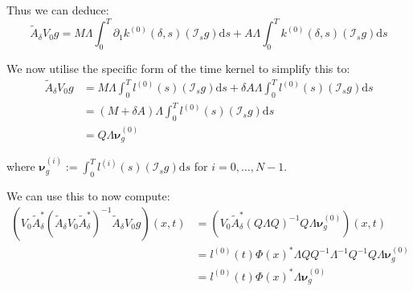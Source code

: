 \documentclass{article}
\theoremstyle{definition}
\theoremstyle{remark}
\theoremstyle{remark}
\begin{document}
\noindent Thus we can deduce:
\begin{equation}
    \tilde{A}_{\delta}V_{0}g=M\Lambda\int_{0}^{T}\partial_{1}k^{(0)}(\delta,s)(\mathcal{I}_{s}g)\mathrm{d}s + A\Lambda\int_{0}^{T}k^{(0)}(\delta,s)(\mathcal{I}_{s}g)\mathrm{d}s
\end{equation}

\noindent We now utilise the specific form of the time kernel to simplify this to:
\begin{align}
    \tilde{A}_{\delta}V_{0}g &= M\Lambda\int_{0}^{T}l^{(0)}(s)(\mathcal{I}_{s}g)\mathrm{d}s + \delta A\Lambda\int_{0}^{T}l^{(0)}(s)(\mathcal{I}_{s}g)\mathrm{d}s \\
    &= (M+\delta A)\Lambda\int_{0}^{T}l^{(0)}(s)(\mathcal{I}_{s}g)\mathrm{d}s \\
    &= Q\Lambda\boldsymbol{\nu}_{g}^{(0)}
\end{align}

where $\boldsymbol{\nu}_{g}^{(i)}:=\int_{0}^{T}l^{(i)}(s)(\mathcal{I}_{s}g)\mathrm{d}s$ for $i=0,\dots,N-1$.

\noindent We can use this to now compute:
\begin{align*}
    (V_{0}\tilde{A}_{\delta}^{*}(\tilde{A}_{\delta}V_{0}\tilde{A}_{\delta}^{*})^{-1}\tilde{A}_{\delta}V_{0}g)(x,t) &=
    (V_{0}\tilde{A}_{\delta}^{*}(Q\Lambda Q)^{-1}Q\Lambda\boldsymbol{\nu}_{g}^{(0)})(x,t) \\
    &=l^{(0)}(t)\Phi(x)^{*}\Lambda Q Q^{-1}\Lambda^{-1}Q^{-1}Q\Lambda\boldsymbol{\nu}_{g}^{(0)} \\
    &=l^{(0)}(t)\Phi(x)^{*}\Lambda\boldsymbol{\nu}_{g}^{(0)}
\end{align*}
\end{document}
